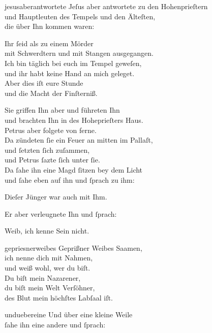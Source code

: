 \documentclass[tocstyle=ref-genre]{ees}
\begin{document}
{\clearpage
\begin{movement}{jesusaberantwortete}
  \voice[Evangelist]
  Jeſus aber antwortete zu den Hohenprieſtern\\
  und Hauptleuten des Tempels und den Älteſten,\\
  die über Ihn kommen waren:

  \voice[Jesus]
  Ihr ſeid als zu einem Mörder\\
  mit Schwerdtern und mit Stangen ausgegangen.\\
  Ich bin täglich bei euch im Tempel geweſen,\\
  und ihr habt keine Hand an mich geleget.\\
  Aber dies iſt eure Stunde\\
  und die Macht der Finſterniß.

  \voice[Evangelist]
  Sie griffen Ihn aber und führeten Ihn\\
  und brachten Ihn in des Hoheprieſters Haus.\\
  Petrus aber folgete von ferne.\\
  Da zündeten ſie ein Feuer an mitten im Pallaſt,\\
  und ſetzten ſich zuſammen,\\
  und Petrus ſazte ſich unter ſie.\\
  Da ſahe ihn eine Magd ſitzen bey dem Licht\\
  und ſahe eben auf ihn und ſprach zu ihm:

  \voice[Magd I]
  Dieſer Jünger war auch mit Ihm.

  \voice[Evangelist]
  Er aber verleugnete Ihn und ſprach:

  \voice[Petrus]
  Weib, ich kenne Sein nicht.
\end{movement}

\begin{movement}{gepriesnerweibes}
  \voice[Alto]
  Geprißner Weibes Saamen,\\
  ich nenne dich mit Nahmen,\\
  und weiß wohl, wer du biſt.\\
  Du biſt mein Nazarener,\\
  du biſt mein Welt Verſöhner,\\
  des Blut mein höchſtes Labſaal iſt.
\end{movement}

\begin{movement}{unduebereine}
  \voice[Evangelist]
  Und über eine kleine Weile\\
  ſahe ihn eine andere und ſprach:


\end{movement}}
\end{document}
